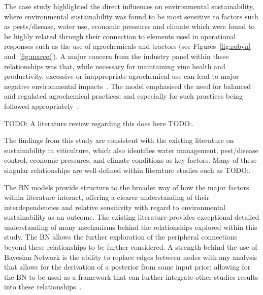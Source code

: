 The case study highlighted the direct influences on environmental sustainability, where environmental sustainability was found to be most sensitive to factors such as pests/disease, water use, economic pressures and climate which were found to be highly related through their connection to elements used in operational responses such as the use of agrochemicals and tractors (see Figures~\ref{fig:robyn} and~\ref{fig:marcel}). A major concern from the industry panel within these relationships was that, while necessary for maintaining vine health and productivity, excessive or inappropriate agrochemical use can lead to major negative environmental impacts~\cite{alonsogonzalezUnveilingTerroirEvaluating2024,manjarres-lopezAssessmentPesticideResidues2021}. The model emphasised the need for balanced and regulated agrochemical practices; and especially for such practices being followed appropriately~\cite{baianoOverviewSustainabilityWine2021}.

TODO: A literature review regarding this does here TODO:. 

The findings from this study are consistent with the existing literature on sustainability in viticulture, which also identifies water management, pest/disease control, economic pressures, and climate conditions as key factors. Many of these singular relationships are well-defined within literature studies such as TODO:.

The BN models provide structure to the broader way of how the major factors within literature interact, offering a clearer understanding of their interdependencies and relative sensitivity with regard to environmental sustainability as an outcome. The existing literature provides exceptional detailed understanding of many mechanisms behind the relationships explored within this study. The BN allows the further exploration of the peripheral connections beyond these relationships to be further considered. A strength behind the use of Bayesian Network is the ability to replace edges between nodes with any analysis that allows for the derivation of a posterior from some input prior; allowing for the BN to be used as a framework that can further integrate other studies results into these relationships~\cite{kimphuctranMachineLearningProbabilistic2022,kollerObjectOrientedBayesianNetworks1997,korbBayesianArtificialIntelligence2011}.

